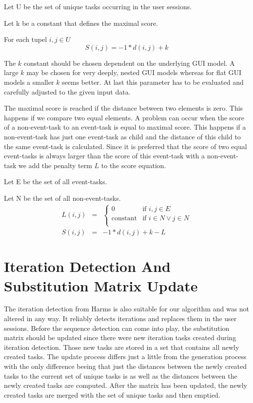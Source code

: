 \begin{definition}
	\item Let U be the set of unique tasks occurring in the user sessions.
	\item Let k be a constant that defines the maximal score.
	\item For each tupel $i,j \in U$
\begin{equation*}
		 S(i,j) = -1*d(i,j)+k
	\label{eq:subscore}
\end{equation*}
\label{def:scorewithmaximalscore}
\end{definition}
The $k$ constant should be chosen dependent on the underlying GUI model.
A large $k$ may be chosen for very deeply, nested GUI models whereas for flat GUI models a smaller $k$ seems better.
At last this parameter has to be evaluated and carefully adjusted to the given input data.

The maximal score is reached if the distance between two elements is zero. This happens if we compare two equal elements.
A problem can occur when the score of a non-event-task to an event-task is equal to maximal score.
This happens if a non-event-task has just one event-task as child and the distance of this child to the same event-task is calculated.
Since it is preferred that the score of two equal event-tasks is always larger than the score of this event-task with a non-event-task we add the penalty term $L$ to the score equation.

\begin{definition}
	\item Let E be the set of all event-tasks.
	\item Let N be the set of all non-event-tasks.
\begin{eqnarray*}
	L(i,j) &=&
	\begin{cases}
		0 & \text{if } i,j \in E \\
		\text{constant} & \text{if } i \in N \lor  j \in N\\
	\end{cases} \\
	S(i,j) &=& -1*d(i,j)+k-L
	\label{eq:subscore_adjusted}
\end{eqnarray*}
\label{def:scoreadjusted}
\end{definition}
\clearpage
\section{Iteration Detection And Substitution Matrix Update}
The iteration detection from Harms is also suitable for our algorithm and was not altered in any way. It reliably detects iterations and replaces them in the user sessions.
Before the sequence detection can come into play, the substitution matrix should be updated since there were new iteration tasks created during iteration detection. Those new tasks are stored in a set that contains all newly created tasks.
The update process differs just a little from the generation process with the only difference beeing that just the distances between the newly created tasks to the current set of unique tasks is as well as the distances between the newly created tasks are computed.
After the matrix has been updated, the newly created tasks are merged with the set of unique tasks and then emptied.

